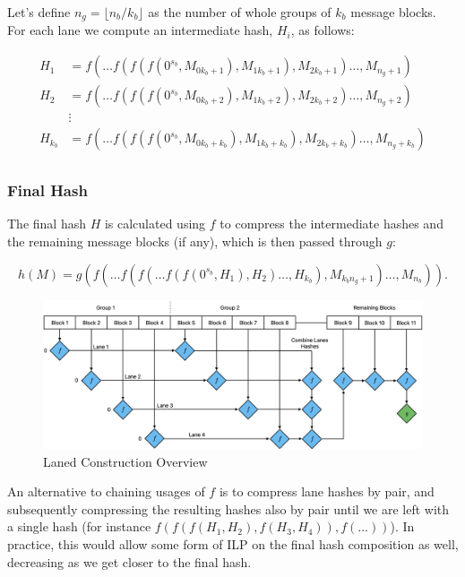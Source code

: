 \documentclass[10pt]{article}
\begin{document}
Let's define \( n_g = \lfloor {n_b}/{k_b} \rfloor \) as the number of whole groups of \( k_b \) message blocks. \\
For each lane we compute an intermediate hash, \( H_i \), as follows:

\begin{align*}
H_{1} &= f(\ldots f(f(f(0^{s_b}, M_{0k_b + 1}), M_{1k_b + 1}), M_{2k_b + 1})\ldots, M_{n_g + 1}) \\
H_{2} &= f(\ldots f(f(f(0^{s_b}, M_{0k_b + 2}), M_{1k_b + 2}), M_{2k_b + 2})\ldots, M_{n_g + 2}) \\
&\vdots \\
H_{k_b} &= f(\ldots f(f(f(0^{s_b}, M_{0k_b + k_b}), M_{1k_b + k_b}), M_{2k_b + k_b})\ldots, M_{n_g + k_b}) \\
\end{align*}

\subsubsection{Final Hash}

The final hash \( H \) is calculated using \( f \) to compress the intermediate hashes and the remaining message blocks (if any),
which is then passed through \( g \):

\begin{equation*}
h(M) = g\left( f( \ldots f(f(\ldots f(f(0^{s_b}, H_1), H_2) \ldots, H_{k_b}), M_{{k_b}{n_g}+1}) \ldots, M_{n_b} ) \right).
\end{equation*}

\begin{figure}[H]
\centering
\includegraphics[width=1\textwidth]{laned-construction.png}
\caption{Laned Construction Overview}
\label{fig:linear-construction}
\end{figure}

An alternative to chaining usages of \( f \) is to compress lane hashes by pair, and subsequently compressing the resulting hashes also by pair until we are left with a single hash (for instance \(f(f(f(H_1, H_2), f(H_3, H_4)), f(...))\)). In practice, this would allow some form of ILP on the final hash composition as well, decreasing as we get closer to the final hash.
\end{document}
